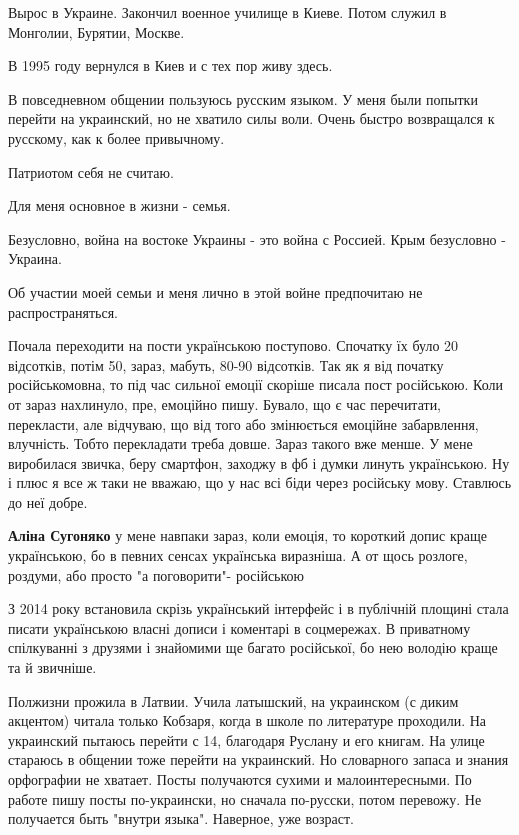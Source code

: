 \begin{itemize}
\begin{itemize}
Вырос в Украине. Закончил военное училище в Киеве. Потом служил в Монголии,
Бурятии, Москве.

В 1995 году вернулся в Киев и с тех пор живу здесь.

В повседневном общении пользуюсь русским языком. У меня были попытки перейти на
украинский, но не хватило силы воли. Очень быстро возвращался к русскому, как к
более привычному.

Патриотом себя не считаю.

Для меня основное в жизни - семья.

Безусловно, война на востоке Украины - это война с Россией. Крым безусловно -
Украина.

Об участии моей семьи и меня лично в этой войне предпочитаю не
распространяться.

\end{itemize} %


Почала переходити на пости українською поступово. Спочатку їх було 20
відсотків, потім 50, зараз, мабуть, 80-90 відсотків. Так як я від початку
російськомовна, то під час сильної емоції скоріше писала пост російською. Коли
от зараз нахлинуло, пре, емоційно пишу. Бувало, що є час перечитати,
перекласти, але відчуваю, що від того або змінюється емоційне забарвлення,
влучність. Тобто перекладати треба довше. Зараз такого вже менше. У мене
виробилася звичка, беру смартфон, заходжу в фб і думки линуть українською. Ну і
плюс я все ж таки не вважаю, що у нас всі біди через російську мову. Ставлюсь
до неї добре.

\begin{itemize} %
\textbf{Аліна Сугоняко} у мене навпаки зараз, коли емоція, то короткий допис краще українською, бо в певних сенсах українська виразніша. А от щось розлоге, роздуми, або просто "а поговорити"- російською
\end{itemize} %


З 2014 року встановила скрізь український інтерфейс і в публічній площині стала
писати українською власні дописи і коментарі в соцмережах. В приватному
спілкуванні з друзями і знайомими ще багато російської, бо нею володію краще та
й звичніше.


Полжизни прожила в Латвии. Учила латышский, на украинском (с диким акцентом)
читала только Кобзаря, когда в школе по литературе проходили. На украинский
пытаюсь перейти с 14, благодаря Руслану и его книгам. На улице стараюсь в
общении тоже перейти на украинский. Но словарного запаса и знания орфографии не
хватает. Посты получаются сухими и малоинтересными. По работе пишу посты
по-украински, но сначала по-русски, потом перевожу. Не получается быть "внутри
языка". Наверное, уже возраст.


\end{itemize}
